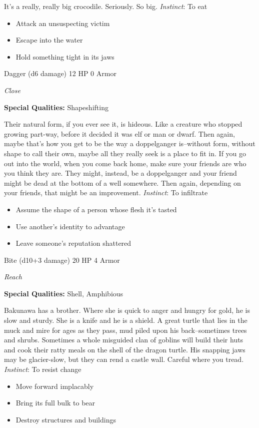 \HRule
It's a really, really big crocodile. Seriously. So big. \emph{Instinct}: To eat
\begin{itemize}
\item Attack an unsuspecting victim
\item Escape into the water
\item Hold something tight in its jaws
\end{itemize}

\HRule
{}

Dagger (d6 damage)\hspace*{\fill} 12 HP 0 Armor

\emph{Close}

\textbf{Special Qualities:}
Shapeshifting

\HRule
Their natural form, if you ever see it, is hideous. Like a creature who stopped growing part-way, before it decided it was elf or man or dwarf. Then again, maybe that's how you get to be the way a doppelganger is--without form, without shape to call their own, maybe all they really seek is a place to fit in. If you go out into the world, when you come back home, make sure your friends are who you think they are. They might, instead, be a doppelganger and your friend might be dead at the bottom of a well somewhere. Then again, depending on your friends, that might be an improvement. \emph{Instinct}: To infiltrate
\begin{itemize}
\item Assume the shape of a person whose flesh it's tasted
\item Use another's identity to advantage
\item Leave someone's reputation shattered
\end{itemize}
\newpage
\HRule
{}

Bite (d10+3 damage)\hspace*{\fill} 20 HP 4 Armor

\emph{Reach}

\textbf{Special Qualities:}
Shell, Amphibious

\HRule
Bakunawa has a brother. Where she is quick to anger and hungry for gold, he is slow and sturdy. She is a knife and he is a shield. A great turtle that lies in the muck and mire for ages as they pass, mud piled upon his back--sometimes trees and shrubs. Sometimes a whole misguided clan of goblins will build their huts and cook their ratty meals on the shell of the dragon turtle. His snapping jaws may be glacier-slow, but they can rend a castle wall. Careful where you tread. \emph{Instinct}: To resist change
\begin{itemize}
\item Move forward implacably
\item Bring its full bulk to bear
\item Destroy structures and buildings
\end{itemize}


